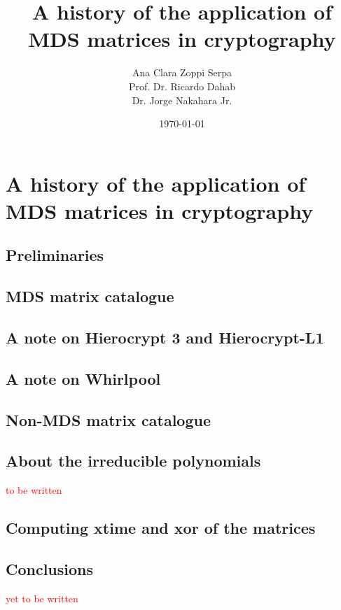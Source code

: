 \documentclass{report}
\title{A history of the application of MDS matrices in cryptography}
\author{Ana Clara Zoppi Serpa\\ Prof. Dr. Ricardo Dahab \\ Dr. Jorge Nakahara Jr.}
\date{\today}
\begin{document}

\maketitle

\tableofcontents

\chapter{A history of the application of MDS matrices in cryptography}



\section{Preliminaries}



\section{MDS matrix catalogue}





\section{A note on Hierocrypt 3 and Hierocrypt-L1}


\section{A note on Whirlpool}\label{sec:whirlpool}


\section{Non-MDS matrix catalogue}


\section{About the irreducible polynomials}
\textcolor{red}{to be written}
%

\section{Computing \textbf{xtime} and \textbf{xor} of the matrices}



\section{Conclusions}
\textcolor{red}{yet to be written}



\end{document}
